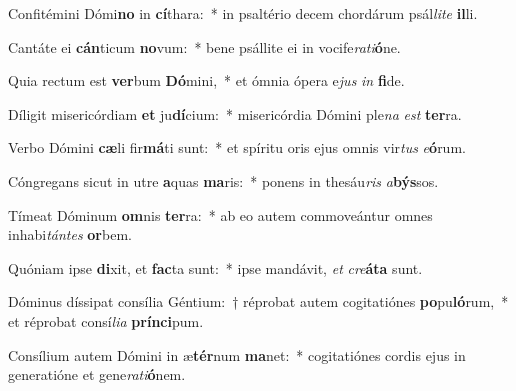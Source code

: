 \item Confitémini Dómi\textbf{no} in \textbf{cí}thara:~* in psaltério decem chordárum psál\textit{li}\textit{te} \textbf{il}li.
\item Cantáte ei \textbf{cán}ticum \textbf{no}vum:~* bene psállite ei in vocife\textit{ra}\textit{ti}\textbf{ó}ne.
\item Quia rectum est \textbf{ver}bum \textbf{Dó}mini,~* et ómnia ópera e\textit{jus} \textit{in} \textbf{fi}de.
\item Díligit misericórdiam \textbf{et} ju\textbf{dí}cium:~* misericórdia Dómini ple\textit{na} \textit{est} \textbf{ter}ra.
\item Verbo Dómini \textbf{cæ}li fir\textbf{má}ti sunt:~* et spíritu oris ejus omnis vir\textit{tus} \textit{e}\textbf{ó}rum.
\item Cóngregans sicut in utre \textbf{a}quas \textbf{ma}ris:~* ponens in thesáu\textit{ris} \textit{a}\textbf{býs}sos.
\item Tímeat Dóminum \textbf{om}nis \textbf{ter}ra:~* ab eo autem commoveántur omnes inhabi\textit{tán}\textit{tes} \textbf{or}bem.
\item Quóniam ipse \textbf{di}xit, et \textbf{fac}ta sunt:~* ipse mandávit, \textit{et} \textit{cre}\textbf{á}\textbf{ta} sunt.
\item Dóminus díssipat consília Géntium:~† réprobat autem cogitatiónes \textbf{po}pu\textbf{ló}rum,~* et réprobat consí\textit{li}\textit{a} \textbf{prín}\textbf{ci}pum.
\item Consílium autem Dómini in æ\textbf{tér}num \textbf{ma}net:~* cogitatiónes cordis ejus in generatióne et gene\textit{ra}\textit{ti}\textbf{ó}nem.
